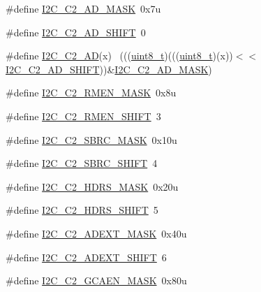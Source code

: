 \begin{DoxyCompactItemize}
\item 
\#define \hyperlink{group___i2_c___register___masks_ga6c5f8db3bac4c51de9446448a8ad9072}{I2\+C\+\_\+\+C2\+\_\+\+A\+D\+\_\+\+M\+A\+SK}~0x7u
\item 
\#define \hyperlink{group___i2_c___register___masks_gab875d484e12dc6ae427c2063430d1362}{I2\+C\+\_\+\+C2\+\_\+\+A\+D\+\_\+\+S\+H\+I\+FT}~0
\item 
\#define \hyperlink{group___i2_c___register___masks_gad82ab5552b298f66f970ca92c4a2610e}{I2\+C\+\_\+\+C2\+\_\+\+AD}(x)                                                      ~(((\hyperlink{_p_e___types_8h_aba7bc1797add20fe3efdf37ced1182c5}{uint8\+\_\+t})(((\hyperlink{_p_e___types_8h_aba7bc1797add20fe3efdf37ced1182c5}{uint8\+\_\+t})(x))$<$$<$\hyperlink{group___i2_c___register___masks_gab875d484e12dc6ae427c2063430d1362}{I2\+C\+\_\+\+C2\+\_\+\+A\+D\+\_\+\+S\+H\+I\+FT}))\&\hyperlink{group___i2_c___register___masks_ga6c5f8db3bac4c51de9446448a8ad9072}{I2\+C\+\_\+\+C2\+\_\+\+A\+D\+\_\+\+M\+A\+SK})
\item 
\#define \hyperlink{group___i2_c___register___masks_ga70911373d5619a4d8376777446085856}{I2\+C\+\_\+\+C2\+\_\+\+R\+M\+E\+N\+\_\+\+M\+A\+SK}~0x8u
\item 
\#define \hyperlink{group___i2_c___register___masks_ga802a10e2d279895ec0230b4701b1a4bf}{I2\+C\+\_\+\+C2\+\_\+\+R\+M\+E\+N\+\_\+\+S\+H\+I\+FT}~3
\item 
\#define \hyperlink{group___i2_c___register___masks_gad5acb46182264a92f1f7ca818146d44e}{I2\+C\+\_\+\+C2\+\_\+\+S\+B\+R\+C\+\_\+\+M\+A\+SK}~0x10u
\item 
\#define \hyperlink{group___i2_c___register___masks_ga620079dc18e7ce504b6092503a10d2ae}{I2\+C\+\_\+\+C2\+\_\+\+S\+B\+R\+C\+\_\+\+S\+H\+I\+FT}~4
\item 
\#define \hyperlink{group___i2_c___register___masks_gaa36c867ead9ecee381f4a6f1f75ccc70}{I2\+C\+\_\+\+C2\+\_\+\+H\+D\+R\+S\+\_\+\+M\+A\+SK}~0x20u
\item 
\#define \hyperlink{group___i2_c___register___masks_ga0d2a8c7a7fb308cf052fc122c1af92c5}{I2\+C\+\_\+\+C2\+\_\+\+H\+D\+R\+S\+\_\+\+S\+H\+I\+FT}~5
\item 
\#define \hyperlink{group___i2_c___register___masks_ga331301810a6ac65f43e66b78bbde4c91}{I2\+C\+\_\+\+C2\+\_\+\+A\+D\+E\+X\+T\+\_\+\+M\+A\+SK}~0x40u
\item 
\#define \hyperlink{group___i2_c___register___masks_ga266bbd66a022e8b78eb5501d9d927164}{I2\+C\+\_\+\+C2\+\_\+\+A\+D\+E\+X\+T\+\_\+\+S\+H\+I\+FT}~6
\item 
\#define \hyperlink{group___i2_c___register___masks_gabe69d0985ed23c71c071a6ebd93f65df}{I2\+C\+\_\+\+C2\+\_\+\+G\+C\+A\+E\+N\+\_\+\+M\+A\+SK}~0x80u
$$
\end{DoxyCompactItemize}
